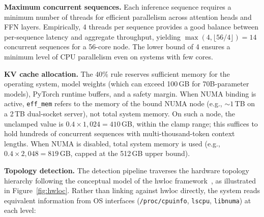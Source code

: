 \documentclass[10pt,conference]{IEEEtran}
\begin{document}
\textbf{Maximum concurrent sequences.}
Each inference sequence requires a minimum number of threads for efficient parallelism across attention heads and FFN layers.
Empirically, 4 threads per sequence provides a good balance between per-sequence latency and aggregate throughput, yielding $\max(4, \lfloor 56/4 \rfloor) = 14$ concurrent sequences for a 56-core node. The lower bound of 4 ensures a minimum level of CPU parallelism even on systems with few cores.

\textbf{KV cache allocation.}
The 40\% rule reserves sufficient memory for the operating system, model weights (which can exceed 100\,GB for 70B-parameter models), PyTorch runtime buffers, and a safety margin.
When NUMA binding is active, \texttt{eff\_mem} refers to the memory of the bound NUMA node (e.g., ${\sim}1$\,TB on a 2\,TB dual-socket server), not total system memory.
On such a node, the unclamped value is $0.4 \times 1{,}024 = 410$\,GB, within the clamp range; this suffices to hold hundreds of concurrent sequences with multi-thousand-token context lengths.
When NUMA is disabled, total system memory is used (e.g., $0.4 \times 2{,}048 = 819$\,GB, capped at the 512\,GB upper bound).

\textbf{Topology detection.}
The detection pipeline traverses the hardware topology hierarchy following the conceptual model of the hwloc framework~\cite{broquedis2010hwloc}, as illustrated in Figure~\ref{fig:hwloc}.
Rather than linking against hwloc directly, the system reads equivalent information from OS interfaces (\texttt{/proc/cpuinfo}, \texttt{lscpu}, \texttt{libnuma}) at each level:
\end{document}

